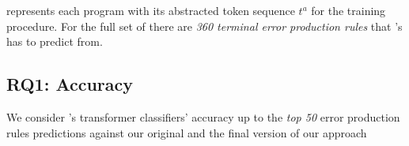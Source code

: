 %
\toolname represents each program with its abstracted token sequence $t^a$ for
the training procedure. For the full set of \python there are \emph{360 terminal
error production rules} that \toolname's has to predict from.



\subsection{RQ1: Accuracy}

\label{sec:eval:accuracy}

%
We consider \toolname's transformer classifiers' accuracy up to the \emph{top
50} error production rules predictions against our original and the final
version of our approach

